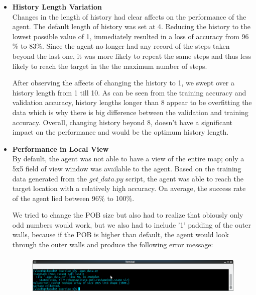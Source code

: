 \documentclass[a4paper]{article}
\begin{document}
\begin{itemize}

\item \textbf{History Length Variation}\\
Changes in the length of history had clear affects on the performance of the agent. The default length of history was set at 4. Reducing the history to the lowest possible value of 1, immediately resulted in a loss of accuracy from 96$\%$ to 83$\%$. Since the agent no longer had any record of the steps taken beyond the last one, it was more likely to repeat the same steps and thus less likely to reach the target in the the maximum number of steps.

After observing the affects of changing the history to 1, we swept over a history length from 1 till 10. As can be seen from the training accuracy and validation accuracy, history lengths longer than 8 appear to be overfitting the data which is why there is big difference between the validation and training accuracy. Overall, changing history beyond 8, doesn't have a significant impact on the performance and would be the optimum history length.


\item \textbf{Performance in Local View}\\
By default, the agent was not able to have a view of the entire map; only a 5x5 field of view window was available to the agent. Based on the training data generated from the \textit{$get\_data.py$} script, the agent was able to reach the target location with a relatively high accuracy. On average, the success rate of the agent lied between 96$\%$ to 100$\%$. 

We tried to change the POB size but also had to realize that obiously only odd numbers would work, but we also had to include '1' padding of the outer walls, because if the POB is higher than default, the agent would look through the outer walls and produce the following error message:

\begin{figure}[hbpt!]
\centering
\includegraphics[height=2cm, width=\textwidth]{error_pob.png}
\label{fig:pob_error}
\end{figure}
\begin{center}


\end{center}
\end{itemize}
\end{document}
